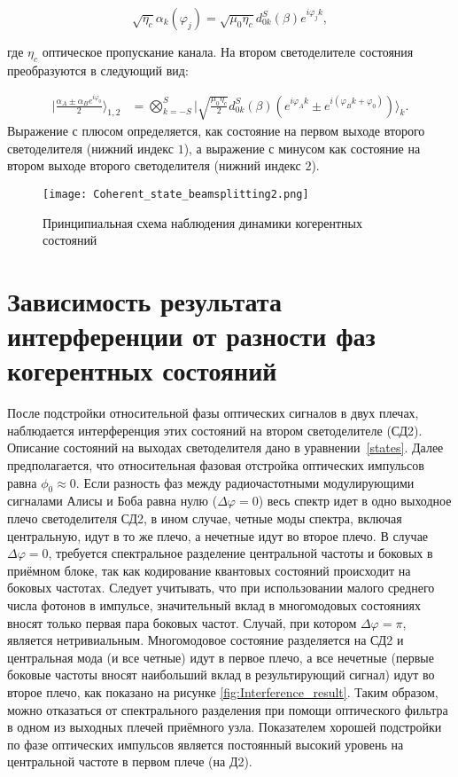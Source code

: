 \begin{equation}
\sqrt{\eta_c}\alpha_k(\varphi_j)=\sqrt{\mu_0\eta_c}d^S_{0k}(\beta)e^{i\varphi_jk},
\end{equation}


где $\eta_c$ оптическое пропускание канала. На втором светоделителе состояния преобразуются в следующий вид: 

\begin{align}\label{states}
\Big|\frac{\alpha_A \pm \alpha_Be^{i\varphi_0}}{2}\Big\rangle_{1,2} &= \bigotimes_{k=-S}^{S}\Big|\sqrt{\frac{\mu_0\eta_c}{2}}d_{0k}^{S}(\beta)\left(e^{i\varphi_Ak}\pm e^{i(\varphi_Bk+\varphi_0)}\right)\Big\rangle_k.
\end{align}
Выражение с плюсом определяется, как состояние на первом выходе второго светоделителя (нижний индекс $1$), а выражение с минусом как состояние на втором выходе второго светоделителя (нижний индекс  $2$). 
 
\begin{figure}[ht]
 \centering
  \texttt{[image: Coherent\_state\_beamsplitting2.png]}
  \caption{Принципиальная схема наблюдения динамики когерентных состояний}
  \label{fig:Coherent_states_beamsplitting2}
\end{figure}

\pagebreak

\section{Зависимость результата интерференции от разности фаз когерентных состояний} \label{ch:ch4/sec7}

После подстройки относительной фазы оптических сигналов в двух плечах, наблюдается интерференция этих состояний на втором светоделителе (СД2). Описание состояний на выходах светоделителя дано в уравнении~\ref{states}. Далее предполагается, что относительная фазовая отстройка оптических импульсов равна $\phi_0\approx0$. Если разность фаз между радиочастотными модулирующими сигналами Алисы и Боба равна нулю ($\Delta\varphi=0$) весь спектр идет в одно выходное плечо светоделителя СД2, в ином случае, четные моды спектра, включая центральную, идут в то же плечо, а нечетные идут во второе плечо. В случае $\Delta\varphi=0$, требуется спектральное разделение центральной частоты и боковых в приёмном блоке, так как кодирование квантовых состояний происходит на боковых частотах. Следует учитывать, что при использовании малого среднего числа фотонов в импульсе, значительный вклад в многомодовых состояниях вносят только первая пара боковых частот. Случай, при котором $\Delta\varphi=\pi$, является нетривиальным. Многомодовое состояние разделяется на СД2 и центральная мода (и все четные) идут в первое плечо, а все нечетные (первые боковые частоты вносят наибольший вклад в результирующий сигнал) идут во второе плечо, как показано на рисунке \ref{fig:Interference_result}. Таким образом, можно отказаться от спектрального разделения при помощи оптического фильтра в одном из выходных плечей приёмного узла. Показателем хорошей подстройки по фазе оптических импульсов является постоянный высокий уровень на центральной частоте в первом плече (на Д2).  



